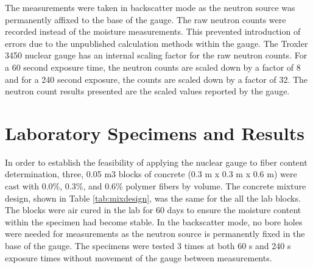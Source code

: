 \documentclass[9pt,twocolumn,twoside]{iscp}
\begin{document}
The measurements were taken in backscatter mode as the neutron source was permanently affixed to the base of the gauge. The raw neutron counts were recorded instead of the moisture measurements. This prevented introduction of errors due to the unpublished calculation methods within the gauge. The Troxler 3450 nuclear gauge has an internal scaling factor for the raw neutron counts. For a 60 second exposure time, the neutron counts are scaled down by a factor of 8 and for a 240 second exposure, the counts are scaled down by a factor of 32. The neutron count results presented are the scaled values reported by the gauge.

\section{Laboratory Specimens and Results}
In order to establish the feasibility of applying the nuclear gauge to fiber content determination, three, 0.05 m3 blocks of concrete (0.3 m x 0.3 m x 0.6 m) were cast with 0.0\%, 0.3\%, and 0.6\% polymer fibers by volume. The concrete mixture design, shown in Table \ref{tab:mixdesign}, was the same for the all the lab blocks. The blocks were air cured in the lab for 60 days to ensure the moisture content within the specimen had become stable. In the backscatter mode, no bore holes were needed for measurements as the neutron source is permanently fixed in the base of the gauge. The specimens were tested 3 times at both 60 s and 240 s exposure times without movement of the gauge between measurements.
\end{document}
